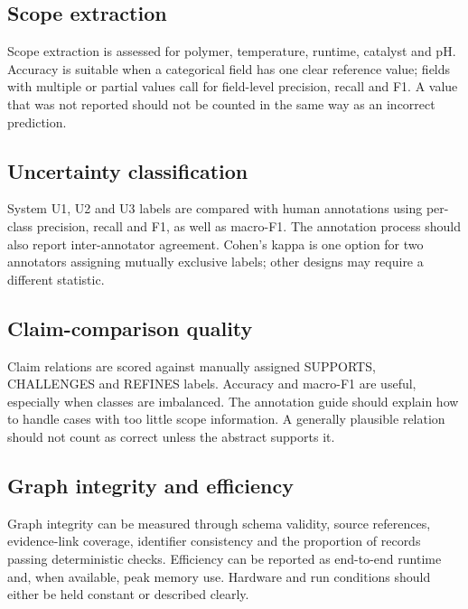 \documentclass[11pt,a4paper]{article}
\begin{document}
\subsection{Scope extraction}

Scope extraction is assessed for polymer, temperature, runtime, catalyst and pH. Accuracy is suitable when a categorical field has one clear reference value; fields with multiple or partial values call for field-level precision, recall and F1. A value that was not reported should not be counted in the same way as an incorrect prediction.

\subsection{Uncertainty classification}

System U1, U2 and U3 labels are compared with human annotations using per-class precision, recall and F1, as well as macro-F1. The annotation process should also report inter-annotator agreement. Cohen's kappa is one option for two annotators assigning mutually exclusive labels; other designs may require a different statistic.

\subsection{Claim-comparison quality}

Claim relations are scored against manually assigned SUPPORTS, CHALLENGES and REFINES labels. Accuracy and macro-F1 are useful, especially when classes are imbalanced. The annotation guide should explain how to handle cases with too little scope information. A generally plausible relation should not count as correct unless the abstract supports it.

\subsection{Graph integrity and efficiency}

Graph integrity can be measured through schema validity, source references, evidence-link coverage, identifier consistency and the proportion of records passing deterministic checks. Efficiency can be reported as end-to-end runtime and, when available, peak memory use. Hardware and run conditions should either be held constant or described clearly.
\end{document}

